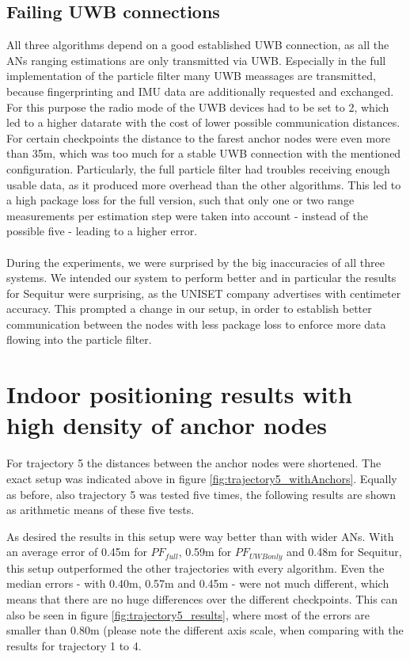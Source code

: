 \subsection{Failing UWB connections}
All three algorithms depend on a good established UWB connection, as all the ANs ranging estimations are only transmitted via UWB. Especially in the full implementation of the particle filter many UWB meassages are transmitted, because fingerprinting and IMU data are additionally requested and exchanged. For this purpose the radio mode of the UWB devices had to be set to 2, which led to a higher datarate with the cost of lower possible communication distances.\\
For certain checkpoints the distance to the farest anchor nodes were even more than 35m, which was too much for a stable UWB connection with the mentioned configuration. Particularly, the full particle filter had troubles receiving enough usable data, as it produced more overhead than the other algorithms. This led to a high package loss for the full version, such that only one or two range measurements per estimation step were taken into account - instead of the possible five - leading to a higher error. 
\\
\\
During the experiments, we were surprised by the big inaccuracies of all three systems. We intended our system to perform better and in particular the results for Sequitur were surprising, as the UNISET company advertises with centimeter accuracy. This prompted a change in our setup, in order to establish better communication between the nodes with less package loss to enforce more data flowing into the particle filter. 


\section{Indoor positioning results with high density of anchor nodes}
For trajectory 5 the distances between the anchor nodes were shortened. The exact setup was indicated above in figure \ref{fig:trajectory5_withAnchors}. Equally as before, also trajectory 5 was tested five times, the following results are shown as arithmetic means of these five tests.

As desired the results in this setup were way better than with wider ANs. With an average error of 0.45m for $PF_{full}$, 0.59m for $PF_{UWBonly}$ and 0.48m for Sequitur, this setup outperformed the other trajectories with every algorithm. Even the median errors - with 0.40m, 0.57m and 0.45m -  were not much different, which means that there are no huge differences over the different checkpoints. This can also be seen in figure \ref{fig:trajectory5_results}, where most of the errors are smaller than 0.80m (please note the different axis scale, when comparing with the results for trajectory 1 to 4.

